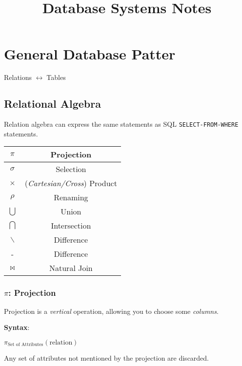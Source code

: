 \documentclass{article}
\def\biconditional{$\leftrightarrow\;$}
\begin{document}
\pagestyle{empty}

\title{Database Systems Notes}
\date{}
\maketitle

\section{General Database Patter}

Relations \biconditional Tables

\subsection{Relational Algebra}

Relation algebra can express the same statements as SQL \texttt{SELECT-FROM-WHERE} statements.

\begin{center}
  \begin{tabular}{|c|c|}
    \hline
    $\pi$ & Projection\\
    \hline
    $\sigma$ & Selection\\
    \hline
    $\times$ & (\textit{Cartesian/Cross}) Product\\
    \hline
    $\rho$ & Renaming\\
    \hline
    $\bigcup$ & Union\\
    \hline
    $\bigcap$ & Intersection\\
    \hline
    $\backslash$ & Difference\\
    \hline
    - & Difference\\
    \hline
    $\Join$ & Natural Join\\
    \hline
  \end{tabular}
\end{center}

\subsubsection{$\pi$: Projection}

Projection is a \textit{vertical} operation, allowing you to choose some \textit{columns}.

\textbf{Syntax}:

$\pi_{\text{Set of Attributes}}(\text{relation})$

Any set of attributes not mentioned by the projection are discarded.
\end{document}
